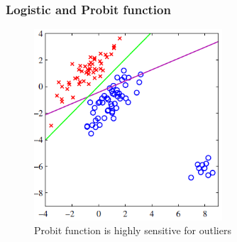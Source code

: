 \documentclass[english,10pt,presentation]{beamer}
\begin{document}
\begin{frame}
\frametitle{Logistic and Probit function}
\label{sec-3_3}

    \begin{figure}[htb]
    \centering
    \includegraphics[width=7cm,angle=0]{./outliers.png}
    \caption{\label{fig:class}Probit function is highly sensitive for outliers \cite{prml}}
    \end{figure}
\end{frame}
\end{document}
